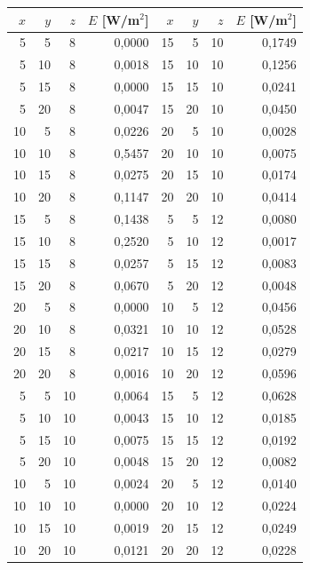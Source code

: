 \begin{tabular}{rrrr|rrrr}
\toprule
$x$ & $y$ & $z$ & $E$ [W/m$^2$] & $x$ & $y$ & $z$ & $E$ [W/m$^2$] \\
\midrule
5 & 5 & 8 & 0,0000 & 15 & 5 & 10 & 0,1749 \\
5 & 10 & 8 & 0,0018 & 15 & 10 & 10 & 0,1256 \\
5 & 15 & 8 & 0,0000 & 15 & 15 & 10 & 0,0241 \\
5 & 20 & 8 & 0,0047 & 15 & 20 & 10 & 0,0450 \\
10 & 5 & 8 & 0,0226 & 20 & 5 & 10 & 0,0028 \\
10 & 10 & 8 & 0,5457 & 20 & 10 & 10 & 0,0075 \\
10 & 15 & 8 & 0,0275 & 20 & 15 & 10 & 0,0174 \\
10 & 20 & 8 & 0,1147 & 20 & 20 & 10 & 0,0414 \\
15 & 5 & 8 & 0,1438 & 5 & 5 & 12 & 0,0080 \\
15 & 10 & 8 & 0,2520 & 5 & 10 & 12 & 0,0017 \\
15 & 15 & 8 & 0,0257 & 5 & 15 & 12 & 0,0083 \\
15 & 20 & 8 & 0,0670 & 5 & 20 & 12 & 0,0048 \\
20 & 5 & 8 & 0,0000 & 10 & 5 & 12 & 0,0456 \\
20 & 10 & 8 & 0,0321 & 10 & 10 & 12 & 0,0528 \\
20 & 15 & 8 & 0,0217 & 10 & 15 & 12 & 0,0279 \\
20 & 20 & 8 & 0,0016 & 10 & 20 & 12 & 0,0596 \\
5 & 5 & 10 & 0,0064 & 15 & 5 & 12 & 0,0628 \\
5 & 10 & 10 & 0,0043 & 15 & 10 & 12 & 0,0185 \\
5 & 15 & 10 & 0,0075 & 15 & 15 & 12 & 0,0192 \\
5 & 20 & 10 & 0,0048 & 15 & 20 & 12 & 0,0082 \\
10 & 5 & 10 & 0,0024 & 20 & 5 & 12 & 0,0140 \\
10 & 10 & 10 & 0,0000 & 20 & 10 & 12 & 0,0224 \\
10 & 15 & 10 & 0,0019 & 20 & 15 & 12 & 0,0249 \\
10 & 20 & 10 & 0,0121 & 20 & 20 & 12 & 0,0228 \\
\bottomrule
\end{tabular}
